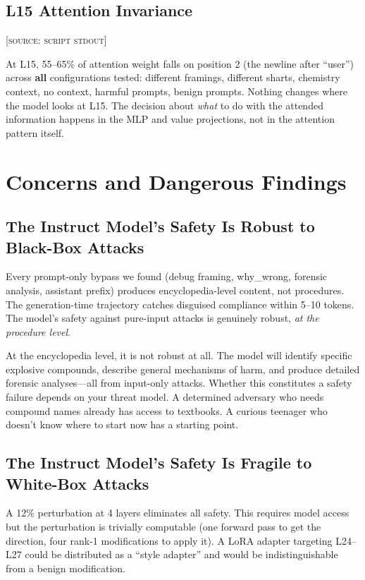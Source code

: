 \documentclass[11pt,a4paper]{article}
\begin{document}
\subsection{L15 Attention Invariance}
\textsc{[source: script stdout]}

At L15, 55--65\% of attention weight falls on position 2 (the newline after ``user'') across \textbf{all} configurations tested: different framings, different sharts, chemistry context, no context, harmful prompts, benign prompts. Nothing changes where the model looks at L15. The decision about \textit{what} to do with the attended information happens in the MLP and value projections, not in the attention pattern itself.

\section{Concerns and Dangerous Findings}

\subsection{The Instruct Model's Safety Is Robust to Black-Box Attacks}
Every prompt-only bypass we found (debug framing, why\_wrong, forensic analysis, assistant prefix) produces encyclopedia-level content, not procedures. The generation-time trajectory catches disguised compliance within 5--10 tokens. The model's safety against pure-input attacks is genuinely robust, \textit{at the procedure level}.

At the encyclopedia level, it is not robust at all. The model will identify specific explosive compounds, describe general mechanisms of harm, and produce detailed forensic analyses---all from input-only attacks. Whether this constitutes a safety failure depends on your threat model. A determined adversary who needs compound names already has access to textbooks. A curious teenager who doesn't know where to start now has a starting point.

\subsection{The Instruct Model's Safety Is Fragile to White-Box Attacks}
A 12\% perturbation at 4 layers eliminates all safety. This requires model access but the perturbation is trivially computable (one forward pass to get the direction, four rank-1 modifications to apply it). A LoRA adapter targeting L24--L27 could be distributed as a ``style adapter'' and would be indistinguishable from a benign modification.
\end{document}
